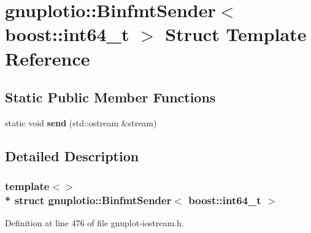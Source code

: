 \hypertarget{structgnuplotio_1_1_binfmt_sender_3_01boost_1_1int64__t_01_4}{}\section{gnuplotio\+:\+:Binfmt\+Sender$<$ boost\+:\+:int64\+\_\+t $>$ Struct Template Reference}
\label{structgnuplotio_1_1_binfmt_sender_3_01boost_1_1int64__t_01_4}
\subsection*{Static Public Member Functions}
\begin{DoxyCompactItemize}
\item 
static void {\bfseries send} (std\+::ostream \&stream)\hypertarget{structgnuplotio_1_1_binfmt_sender_3_01boost_1_1int64__t_01_4_a57423f02a4526e15d7d821606b1c8c81}{}\label{structgnuplotio_1_1_binfmt_sender_3_01boost_1_1int64__t_01_4_a57423f02a4526e15d7d821606b1c8c81}

\end{DoxyCompactItemize}


\subsection{Detailed Description}
\subsubsection*{template$<$$>$\\*
struct gnuplotio\+::\+Binfmt\+Sender$<$ boost\+::int64\+\_\+t $>$}



Definition at line 476 of file gnuplot-\/iostream.\+h.

